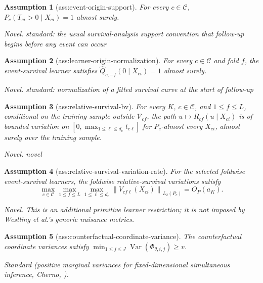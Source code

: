 \documentclass{article}
\newtheorem{assumption}{Assumption}
\begin{document}
\begin{assumption}[ass:event-origin-support]\label{ass:event-origin-support}
For every \(c\in\mathcal C\), \(P_c(T_{ci}>0\mid X_{ci})=1\) almost surely.
\par\smallskip\noindent\emph{Novel.} standard: the usual survival-analysis support convention that follow-up begins before any event can occur
\end{assumption}

\begin{assumption}[ass:learner-origin-normalization]\label{ass:learner-origin-normalization}
For every \(c\in\mathcal C\) and fold \(f\), the event-survival learner satisfies \(\widehat Q_{c,-f}(0\mid X_{ci})=1\) almost surely.
\par\smallskip\noindent\emph{Novel.} standard: normalization of a fitted survival curve at the start of follow-up
\end{assumption}

\begin{assumption}[ass:relative-survival-bv]\label{ass:relative-survival-bv}
For every \(K\), \(c\in\mathcal C\), and \(1\le f\le L\), conditional on the training sample outside \(\mathcal V_{cf}\), the path \(u\mapsto R_{cf}(u\mid X_{ci})\) is of bounded variation on \([0,\max_{1\le\ell\le d_c}t_{c\ell}]\) for \(P_c\)-almost every \(X_{ci}\), almost surely over the training sample.
\par\smallskip\noindent\emph{Novel.} novel
\end{assumption}

\begin{assumption}[ass:relative-survival-variation-rate]\label{ass:relative-survival-variation-rate}
For the selected foldwise event-survival learners, the foldwise relative-survival variations satisfy
\[
 \max_{c\in\mathcal C}\max_{1\le f\le L}\max_{1\le\ell\le d_c}
 \left\|V_{cf\ell}(X_{ci})\right\|_{L_2(P_c)}=O_P(a_K).
\]
\par\smallskip\noindent\emph{Novel.} This is an additional primitive learner restriction; it is not imposed by Westling et al.'s generic nuisance metrics.
\end{assumption}

\begin{assumption}[ass:counterfactual-coordinate-variance]\label{ass:counterfactual-coordinate-variance}
The counterfactual coordinate variances satisfy \(\min_{1\le j\le J}\operatorname{Var}(\Phi_{\theta,i,j})\ge v\).
\par\smallskip\noindent\emph{Standard} (positive marginal variances for fixed-dimensional simultaneous inference, Cherno, \cite{ChernozhukovChetverikovKato2013}).
\end{assumption}
\end{document}
